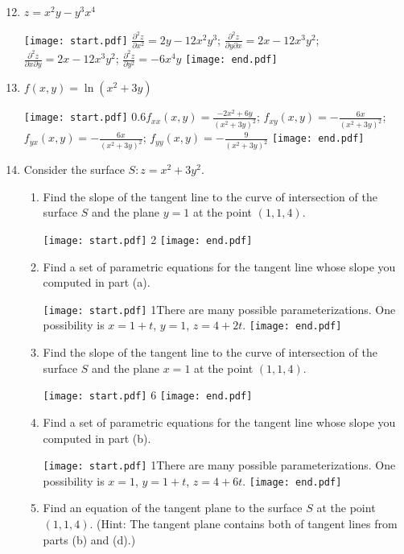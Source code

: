 \documentclass[12pt]{article}
\begin{document}
\begin{enumerate}
\setcounter{enumi}{11}

\item $z=x^2y-y^3x^4$ 

\texttt{[image: start.pdf]}
{{$\frac{\partial^2z}{\partial x^2}=2y-12x^2y^3$; $\frac{\partial^2z}{\partial y \partial x}=2x-12x^3y^2$; $\frac{\partial^2z}{\partial x \partial y}=2x-12x^3y^2$; $\frac{\partial^2z}{\partial y^2}=-6x^4y$}}
\texttt{[image: end.pdf]}


\item $f(x,y)=\ln{(x^2+3y)}$ 

\texttt{[image: start.pdf]}
{{{0.6\linewidth}{$f_{xx}(x,y)=\frac{-2x^2+6y}{(x^2+3y)^2}$; $f_{xy}(x,y)=-\frac{6x}{(x^2+3y)^2}$;\\ $f_{yx}(x,y)=-\frac{6x}{(x^2+3y)^2}$; $f_{yy}(x,y)=-\frac{9}{(x^2+3y)^2}$}}}
\texttt{[image: end.pdf]}


\item Consider the surface $S: z=x^2+3y^2$.  

\begin{enumerate}

\item Find the slope of the tangent line to the curve of intersection of the surface $S$ and the plane $y=1$ at the point $(1,1,4)$.

\texttt{[image: start.pdf]}
{{2}}
\texttt{[image: end.pdf]}


\item Find a set of parametric equations for the tangent line whose slope you computed in part (a).  

\texttt{[image: start.pdf]}
{{{1\linewidth}{There are many possible parameterizations.  One possibility is $x=1+t$, $y=1$, $z=4+2t$.}}}
\texttt{[image: end.pdf]}


\item Find the slope of the tangent line to the curve of intersection of the surface $S$ and the plane $x=1$ at the point $(1,1,4)$.

\texttt{[image: start.pdf]}
{{6}}
\texttt{[image: end.pdf]}


\item Find a set of parametric equations for the tangent line whose slope you computed in part (b).  

\texttt{[image: start.pdf]}
{{{1\linewidth}{There are many possible parameterizations.  One possibility is $x=1$, $y=1+t$, $z=4+6t$.}}}
\texttt{[image: end.pdf]}


\item Find an equation of the tangent plane to the surface $S$ at the point $(1,1,4)$. (Hint: The tangent plane contains both of tangent lines from parts (b) and (d).)


\end{enumerate}
\end{enumerate}
\end{document}
